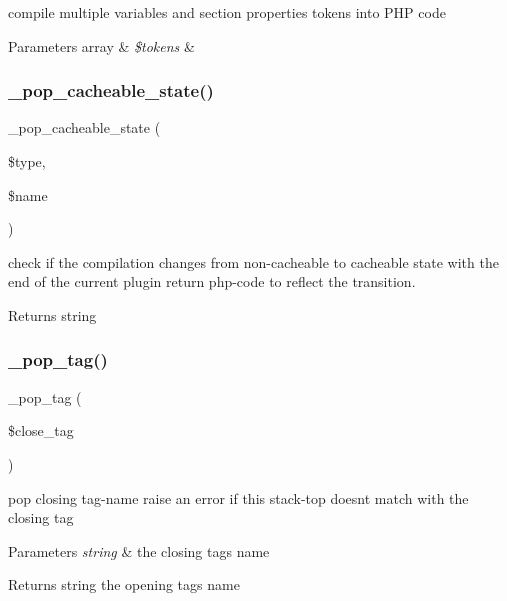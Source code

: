 compile multiple variables and section properties tokens into P\+HP code


\begin{DoxyParams}[1]{Parameters}
array & {\em \$tokens} & \\
\hline
\end{DoxyParams}
\mbox{\label{class_smarty___compiler_a485abbea43510914e066dcc2f0ebbfc0}} 
\subsubsection{\texorpdfstring{\+\_\+pop\+\_\+cacheable\+\_\+state()}{\_pop\_cacheable\_state()}}
{\footnotesize\ttfamily \+\_\+pop\+\_\+cacheable\+\_\+state (\begin{DoxyParamCaption}\item[{}]{\$type,  }\item[{}]{\$name }\end{DoxyParamCaption})}

check if the compilation changes from non-\/cacheable to cacheable state with the end of the current plugin return php-\/code to reflect the transition. \begin{DoxyReturn}{Returns}
string 
\end{DoxyReturn}
\mbox{\label{class_smarty___compiler_a4236d065e7b94b1189e57274249eb6db}} 
\subsubsection{\texorpdfstring{\+\_\+pop\+\_\+tag()}{\_pop\_tag()}}
{\footnotesize\ttfamily \+\_\+pop\+\_\+tag (\begin{DoxyParamCaption}\item[{}]{\$close\+\_\+tag }\end{DoxyParamCaption})}

pop closing tag-\/name raise an error if this stack-\/top doesn\textquotesingle{}t match with the closing tag 
\begin{DoxyParams}{Parameters}
{\em string} & the closing tag\textquotesingle{}s name \\
\hline
\end{DoxyParams}
\begin{DoxyReturn}{Returns}
string the opening tag\textquotesingle{}s name 
\end{DoxyReturn}
\mbox{\label{class_smarty___compiler_a11b685691a5b572278f01ff01c31afbe}} 
